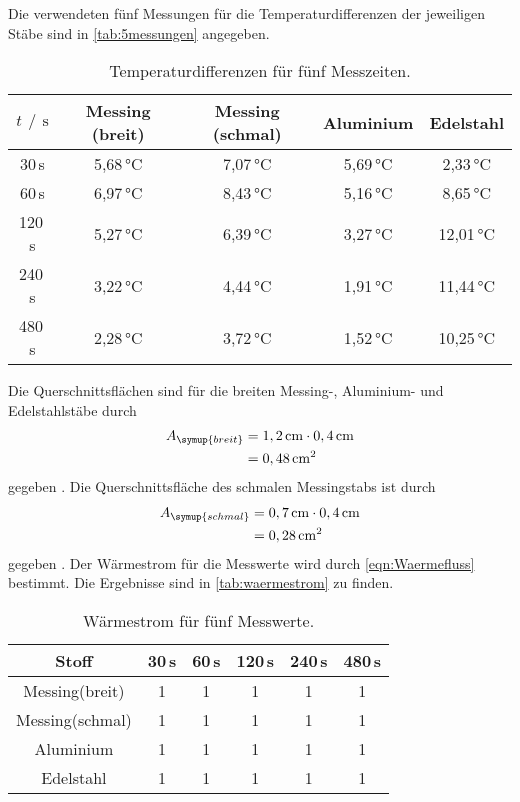 Die verwendeten fünf Messungen für die Temperaturdifferenzen der jeweiligen Stäbe sind in \autoref{tab:5messungen} angegeben.
\begin{table}[h]
  \centering
  \caption{Temperaturdifferenzen für fünf Messzeiten.}
  \label{tab:5messungen}
  \begin{tabular}{c c c c c}
    \toprule
    $t\,\mathbin{/}\,\si{\second}$ & Messing (breit) & Messing (schmal) & Aluminium & Edelstahl \\
    \midrule
     30\,\si{\second} & 5,68\,\si{\celsius} & 7,07\,\si{\celsius} & 5,69\,\si{\celsius} & 2,33\,\si{\celsius} \\
     60\,\si{\second} & 6,97\,\si{\celsius} & 8,43\,\si{\celsius} & 5,16\,\si{\celsius} & 8,65\,\si{\celsius} \\
    120\,\si{\second} & 5,27\,\si{\celsius} & 6,39\,\si{\celsius} & 3,27\,\si{\celsius} & 12,01\,\si{\celsius} \\
    240\,\si{\second} & 3,22\,\si{\celsius} & 4,44\,\si{\celsius} & 1,91\,\si{\celsius} & 11,44\,\si{\celsius} \\
    480\,\si{\second} & 2,28\,\si{\celsius} & 3,72\,\si{\celsius} & 1,52\,\si{\celsius} & 10,25\,\si{\celsius} \\
    \bottomrule
  \end{tabular}
\end{table}

Die Querschnittsflächen sind für die breiten Messing-, Aluminium- und Edelstahlstäbe durch
\begin{align*}
  A_{\symup{breit}} &= 1,2\,\si{\centi\meter}\cdot 0,4\,\si{\centi\meter} \\
                    &= 0,48\,\si{\centi\meter^2}
\end{align*}
gegeben \cite{sample}. Die Querschnittsfläche des schmalen Messingstabs ist durch
\begin{align*}
  A_{\symup{schmal}} &= 0,7\,\si{\centi\meter}\cdot 0,4\,\si{\centi\meter} \\
                     &= 0,28\,\si{\centi\meter^2}
\end{align*}
gegeben \cite{sample}.
Der Wärmestrom für die Messwerte wird durch \autoref{eqn:Waermefluss} bestimmt. Die Ergebnisse sind in \autoref{tab:waermestrom} zu finden.
\begin{table}
  \centering
  \caption{Wärmestrom für fünf Messwerte.}
  \label{tab:waermestrom}
  \begin{tabular}{c | c c c c c}
    \toprule
    Stoff & 30\,\si{\second} & 60\,\si{\second} & 120\,\si{\second} & 240\,\si{\second} & 480\,\si{\second} \\
    \midrule
    Messing(breit)  & 1 & 1 & 1 & 1 & 1 \\
    Messing(schmal) & 1 & 1 & 1 & 1 & 1 \\
    Aluminium       & 1 & 1 & 1 & 1 & 1 \\
    Edelstahl       & 1 & 1 & 1 & 1 & 1 \\
    \bottomrule
  \end{tabular}
\end{table}

